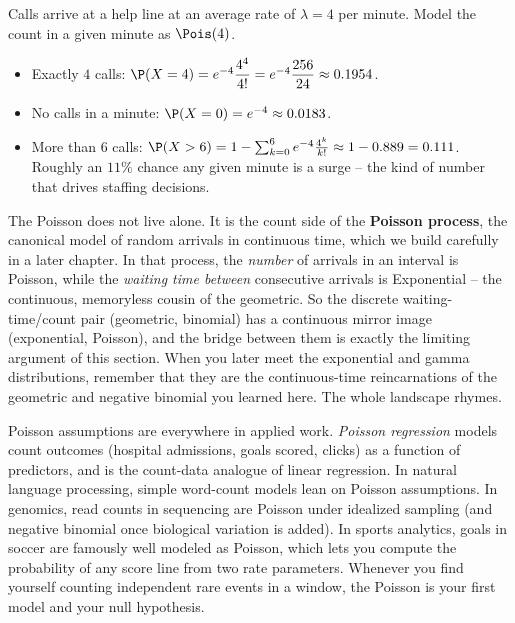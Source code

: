 \begin{example}
\label{ch07:ex-callcenter}
Calls arrive at a help line at an average rate of $\lambda = 4$ per minute. Model
the count in a given minute as $\Pois(4)$.
\begin{itemize}
\item Exactly $4$ calls: $\P(X=4) = e^{-4}\dfrac{4^4}{4!}
  = e^{-4}\dfrac{256}{24} \approx 0.1954$.
\item No calls in a minute: $\P(X = 0) = e^{-4} \approx 0.0183$.
\item More than $6$ calls: $\P(X > 6) = 1 - \sum_{k=0}^{6} e^{-4}\frac{4^k}{k!}
  \approx 1 - 0.889 = 0.111$. Roughly an $11\%$ chance any given minute is a
  surge -- the kind of number that drives staffing decisions.
\end{itemize}
\end{example}

\begin{connectionbox}
The Poisson does not live alone. It is the count side of the \textbf{Poisson
process}, the canonical model of random arrivals in continuous time, which we
build carefully in a later chapter. In that process, the \emph{number} of arrivals
in an interval is Poisson, while the \emph{waiting time between} consecutive
arrivals is Exponential -- the continuous, memoryless cousin of the geometric. So
the discrete waiting-time/count pair (geometric, binomial) has a continuous mirror
image (exponential, Poisson), and the bridge between them is exactly the limiting
argument of this section. When you later meet the exponential and gamma
distributions, remember that they are the continuous-time reincarnations of the
geometric and negative binomial you learned here. The whole landscape rhymes.
\end{connectionbox}

\begin{applicationbox}
Poisson assumptions are everywhere in applied work. \emph{Poisson regression}
models count outcomes (hospital admissions, goals scored, clicks) as a function of
predictors, and is the count-data analogue of linear regression. In natural
language processing, simple word-count models lean on Poisson assumptions. In
genomics, read counts in sequencing are Poisson under idealized sampling (and
negative binomial once biological variation is added). In sports analytics, goals
in soccer are famously well modeled as Poisson, which lets you compute the
probability of any score line from two rate parameters. Whenever you find yourself
counting independent rare events in a window, the Poisson is your first model and
your null hypothesis.
\end{applicationbox}

